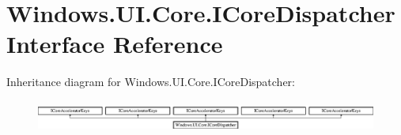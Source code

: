 \hypertarget{interface_windows_1_1_u_i_1_1_core_1_1_i_core_dispatcher}{}\section{Windows.\+U\+I.\+Core.\+I\+Core\+Dispatcher Interface Reference}
\label{interface_windows_1_1_u_i_1_1_core_1_1_i_core_dispatcher}
Inheritance diagram for Windows.\+U\+I.\+Core.\+I\+Core\+Dispatcher\+:\begin{figure}[H]
\begin{center}
\leavevmode
\includegraphics[height=1.051643cm]{interface_windows_1_1_u_i_1_1_core_1_1_i_core_dispatcher}
\end{center}
\end{figure}
